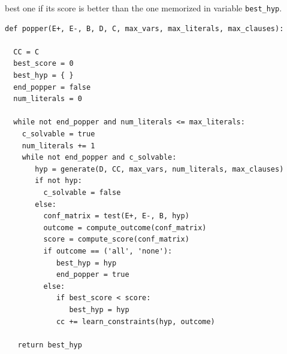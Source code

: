 best one if its score is better than the one memorized in variable \texttt{best\_hyp}. 



\begin{algorithm}[t]
  \caption{Popper (inspired by \cite{cropper2021learning})}
  \label{alg:popper}
  \small
\begin{lstlisting}
def popper(E+, E-, B, D, C, max_vars, max_literals, max_clauses):

  CC = C
  best_score = 0
  best_hyp = { }
  end_popper = false
  num_literals = 0

  while not end_popper and num_literals <= max_literals:
    c_solvable = true
    num_literals += 1
    while not end_popper and c_solvable:
       hyp = generate(D, CC, max_vars, num_literals, max_clauses)
       if not hyp: 
         c_solvable = false
       else:
         conf_matrix = test(E+, E-, B, hyp)
         outcome = compute_outcome(conf_matrix)
         score = compute_score(conf_matrix)
         if outcome == ('all', 'none'):
            best_hyp = hyp
            end_popper = true
         else:
            if best_score < score: 
               best_hyp = hyp
            cc += learn_constraints(hyp, outcome)

   return best_hyp
\end{lstlisting}
\end{algorithm}









